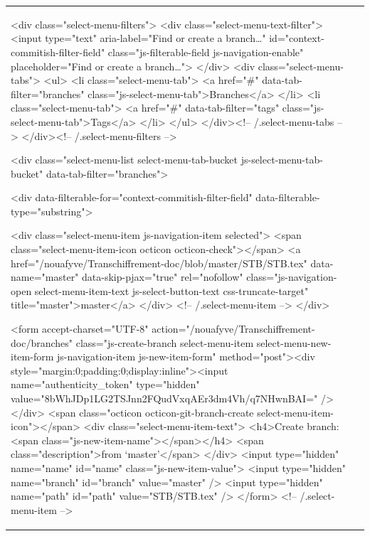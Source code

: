\documentclass[a4paper,11pt,french]{article}
\begin{document}
\begin{tabular}{|m{8cm}|m{8cm}|}
      <div class="select-menu-filters">
        <div class="select-menu-text-filter">
          <input type="text" aria-label="Find or create a branch…" id="context-commitish-filter-field" class="js-filterable-field js-navigation-enable" placeholder="Find or create a branch…">
        </div>
        <div class="select-menu-tabs">
          <ul>
            <li class="select-menu-tab">
              <a href="#" data-tab-filter="branches" class="js-select-menu-tab">Branches</a>
            </li>
            <li class="select-menu-tab">
              <a href="#" data-tab-filter="tags" class="js-select-menu-tab">Tags</a>
            </li>
          </ul>
        </div><!-- /.select-menu-tabs -->
      </div><!-- /.select-menu-filters -->

      <div class="select-menu-list select-menu-tab-bucket js-select-menu-tab-bucket" data-tab-filter="branches">

        <div data-filterable-for="context-commitish-filter-field" data-filterable-type="substring">


            <div class="select-menu-item js-navigation-item selected">
              <span class="select-menu-item-icon octicon octicon-check"></span>
              <a href="/nouafyve/Transchiffrement-doc/blob/master/STB/STB.tex"
                 data-name="master"
                 data-skip-pjax="true"
                 rel="nofollow"
                 class="js-navigation-open select-menu-item-text js-select-button-text css-truncate-target"
                 title="master">master</a>
            </div> <!-- /.select-menu-item -->
        </div>

          <form accept-charset="UTF-8" action="/nouafyve/Transchiffrement-doc/branches" class="js-create-branch select-menu-item select-menu-new-item-form js-navigation-item js-new-item-form" method="post"><div style="margin:0;padding:0;display:inline"><input name="authenticity_token" type="hidden" value="8bWhJDp1LG2TSJnn2FQudVxqAEr3dm4Vh/q7NHwnBAI=" /></div>
            <span class="octicon octicon-git-branch-create select-menu-item-icon"></span>
            <div class="select-menu-item-text">
              <h4>Create branch: <span class="js-new-item-name"></span></h4>
              <span class="description">from ‘master’</span>
            </div>
            <input type="hidden" name="name" id="name" class="js-new-item-value">
            <input type="hidden" name="branch" id="branch" value="master" />
            <input type="hidden" name="path" id="path" value="STB/STB.tex" />
          </form> <!-- /.select-menu-item -->


\end{tabular}
\end{document}
